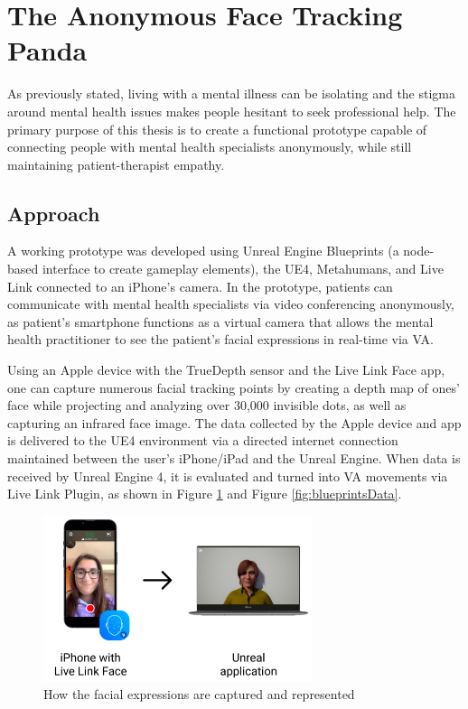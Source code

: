 \section{The Anonymous Face Tracking Panda}
As previously stated, living with a mental illness can be isolating and the stigma around mental health issues makes people hesitant to seek professional help. The primary purpose of this thesis is to create a functional prototype capable of connecting people with mental health specialists anonymously, while still maintaining patient-therapist empathy.

\subsection{Approach}
A working prototype was developed using Unreal Engine Blueprints (a node-based interface to create gameplay elements), the UE4, Metahumans, and Live Link connected to an iPhone's camera. In the prototype, patients can communicate with mental health specialists via video conferencing anonymously, as patient's smartphone functions as a virtual camera that allows the mental health practitioner to see the patient's facial expressions in real-time via VA.

Using an Apple device with the TrueDepth sensor and the Live Link Face app, one can capture numerous facial tracking points by creating a depth map of ones’ face while projecting and analyzing over 30,000 invisible dots, as well as capturing an infrared face image. The data collected by the Apple device and app is delivered to the UE4 environment via a directed internet connection maintained between the user's iPhone/iPad and the Unreal Engine. When data is received by Unreal Engine 4, it is evaluated and turned into VA movements via Live Link Plugin, as shown in Figure \ref{fig:facialExpressions} and Figure \ref{fig:blueprintsData}.

\begin{figure}[!htb]
\includegraphics[width=0.7\textwidth]{figures/howItWorks.png}
\centering
\caption{How the facial expressions are captured and represented}
\label{fig:facialExpressions}
\end{figure}

